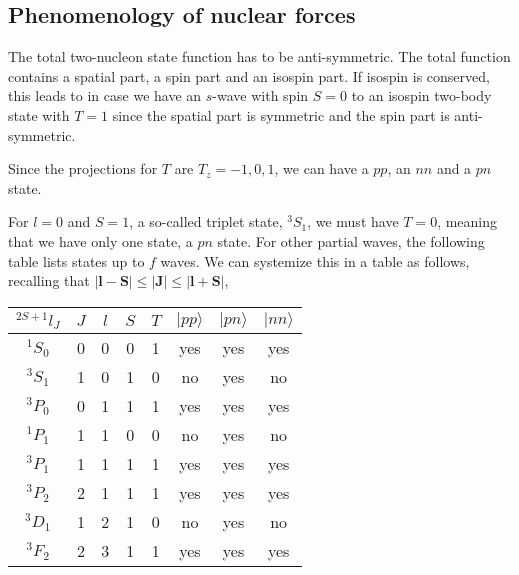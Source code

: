 \documentclass[%
twoside,                 %
final,                   %
10pt]{article}
\begin{document}
\subsection{Phenomenology of nuclear forces}
\begin{block}{}

The total two-nucleon state function has to be anti-symmetric. The total function contains a spatial part, a spin part and an isospin part. If isospin is conserved, this leads to in case we have an $s$-wave with spin $S=0$ to an isospin 
two-body state with $T=1$ since the spatial part is symmetric and the spin part is anti-symmetric. 

Since the projections for $T$ are $T_z=-1,0,1$, we can have a $pp$, an $nn$ and a $pn$ state.

For $l=0$ and $S=1$, a so-called triplet state, $^3S_1$, we must have $T=0$, meaning that we have only one state, a $pn$ state. For other partial waves, the following table lists states up to $f$ waves.
We can systemize this in a table as follows, recalling that $|\mathbf{l}-\mathbf{S}| \le |\mathbf{J}| \le |\mathbf{l}+\mathbf{S}|$,  


{\footnotesize
\begin{tabular}{cccccccc}
\hline
\multicolumn{1}{c}{ $^{2S+1}l_J$ } & \multicolumn{1}{c}{ $J$ } & \multicolumn{1}{c}{ $l$ } & \multicolumn{1}{c}{ $S$ } & \multicolumn{1}{c}{ $T$ } & \multicolumn{1}{c}{ $\vert pp\rangle$ } & \multicolumn{1}{c}{ $\vert pn\rangle$ } & \multicolumn{1}{c}{ $\vert nn\rangle$ } \\
\hline
$^{1}S_0$    & 0   & 0   & 0   & 1   & yes               & yes               & yes               \\
$^{3}S_1$    & 1   & 0   & 1   & 0   & no                & yes               & no                \\
$^{3}P_0$    & 0   & 1   & 1   & 1   & yes               & yes               & yes               \\
$^{1}P_1$    & 1   & 1   & 0   & 0   & no                & yes               & no                \\
$^{3}P_1$    & 1   & 1   & 1   & 1   & yes               & yes               & yes               \\
$^{3}P_2$    & 2   & 1   & 1   & 1   & yes               & yes               & yes               \\
$^{3}D_1$    & 1   & 2   & 1   & 0   & no                & yes               & no                \\
$^{3}F_2$    & 2   & 3   & 1   & 1   & yes               & yes               & yes               \\
\hline
\end{tabular}
}

\noindent
\end{block}
\end{document}
